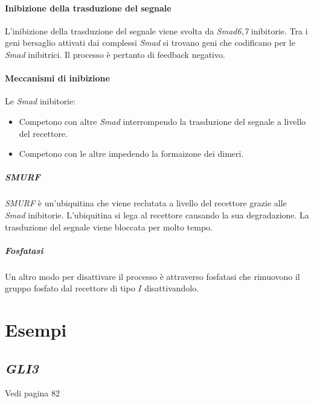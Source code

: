 			\paragraph{Inibizione della trasduzione del segnale}
			L'inibizione della trasduzione del segnale viene svolta da \emph{Smad6,7} inibitorie.
			Tra i geni bersaglio attivati dai complessi \emph{Smad} si trovano geni che codificano per le \emph{Smad} inibitrici.
			Il processo \`e pertanto di feedback negativo.
			
				\paragraph{Meccanismi di inibizione}
				Le \emph{Smad} inibitorie:
				\begin{multicols}{2}
					\begin{itemize}
						\item Competono con altre \emph{Smad} interrompendo la trasduzione del segnale a livello del recettore.
						\item Competono con le altre impedendo la formaizone dei dimeri.
					\end{itemize}
				\end{multicols}

					\subparagraph{\emph{SMURF}}
					\emph{SMURF} \`e un'ubiquitina che viene reclutata a livello del recettore grazie alle \emph{Smad} inibitorie.
					L'ubiquitina si lega al recettore causando la sua degradazione.
					La trasduzione del segnale viene bloccata per molto tempo.

					\subparagraph{Fosfatasi}
					Un altro modo per disattivare il processo \`e attraverso fosfatasi che rimuovono il gruppo fosfato dal recettore di tipo $I$ disattivandolo.

			



\section{Esempi}

	\subsection{\emph{GLI3}}
	Vedi pagina 82

